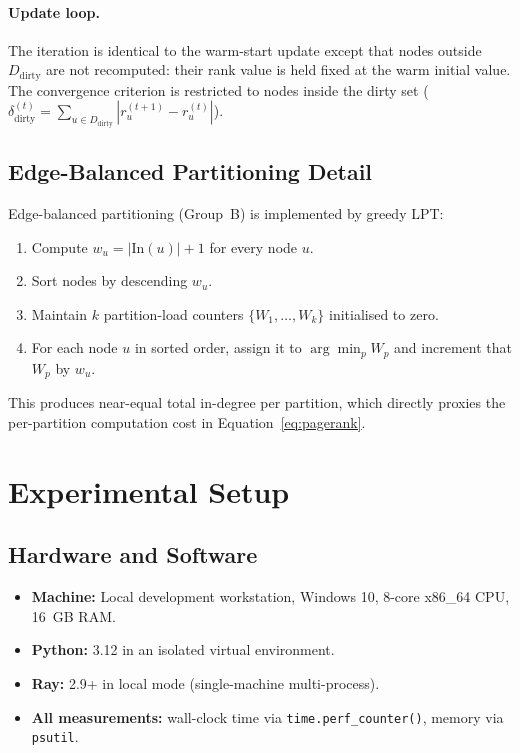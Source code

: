 \documentclass[11pt,a4paper]{article}
\begin{document}
\paragraph{Update loop.} The iteration is identical to the warm-start
update except that nodes outside $D_{\text{dirty}}$ are not recomputed:
their rank value is held fixed at the warm initial value. The
convergence criterion is restricted to nodes inside the dirty set
($\delta_{\text{dirty}}^{(t)} = \sum_{u \in D_{\text{dirty}}} | r_u^{(t+1)} - r_u^{(t)} |$).

\subsection{Edge-Balanced Partitioning Detail}
Edge-balanced partitioning (Group~B) is implemented by greedy LPT:
\begin{enumerate}
    \item Compute $w_u = |\mathrm{In}(u)| + 1$ for every node $u$.
    \item Sort nodes by descending $w_u$.
    \item Maintain $k$ partition-load counters
    $\{W_1, \dots, W_k\}$ initialised to zero.
    \item For each node $u$ in sorted order, assign it to
    $\arg\min_p W_p$ and increment that $W_p$ by $w_u$.
\end{enumerate}
This produces near-equal total in-degree per partition, which directly
proxies the per-partition computation cost in
Equation~\ref{eq:pagerank}.

\section{Experimental Setup}

\subsection{Hardware and Software}
\begin{itemize}
    \item \textbf{Machine:} Local development workstation, Windows 10,
    8-core x86\_64 CPU, 16~GB RAM.
    \item \textbf{Python:} 3.12 in an isolated virtual environment.
    \item \textbf{Ray:} 2.9+ in local mode (single-machine
    multi-process).
    \item \textbf{All measurements:} wall-clock time via
    \texttt{time.perf\_counter()}, memory via \texttt{psutil}.
\end{itemize}
\end{document}
